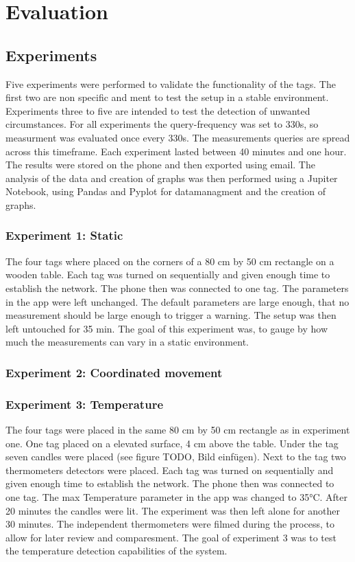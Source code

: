 \chapter{Evaluation}
\label{chap:evaluation}



\section{Experiments}
\label{s:Experiments}
Five experiments were performed to validate the functionality of the tags.
The first two are non specific and ment to test the setup in a stable environment.
Experiments three to five are intended to test the detection of unwanted circumstances.
For all experiments the query-frequency was set to 330s, so measurment was evaluated once every 330s.
The measurements queries are spread across this timeframe.
Each experiment lasted between 40 minutes and one hour.
The results were stored on the phone and then exported using email.
The analysis of the data and creation of graphs was then performed using a Jupiter Notebook, using Pandas and Pyplot for datamanagment and the creation of graphs.


\subsection{Experiment 1: Static}
\label{ss:exp_1}
The four tags where placed on the corners of a 80 cm by 50 cm rectangle on a wooden table.
Each tag was turned on sequentially and given enough time to establish the network.
The phone then was connected to one tag.
The parameters in the app were left unchanged.
The default parameters are large enough, that no measurement should be large enough to trigger a warning.
The setup was then left untouched for 35 min.
The goal of this experiment was, to gauge by how much the measurements can vary in a static environment.
 

\subsection{Experiment 2: Coordinated movement}
\label{ss:exp_2}

\subsection{Experiment 3: Temperature}
\label{ss:exp_3}
The four tags were placed in the same 80 cm by 50 cm rectangle as in experiment one.
One tag placed on a elevated surface, 4 cm above the table.
Under the tag seven candles were placed (see figure TODO, Bild einfügen).
Next to the tag two thermometers detectors were placed.
Each tag was turned on sequentially and given enough time to establish the network.
The phone then was connected to one tag.
The max Temperature parameter in the app was changed to 35°C.
After 20 minutes the candles were lit.
The experiment was then left alone for another 30 minutes.
The independent thermometers were filmed during the process, to allow for later review and comparesment.
The goal of experiment 3 was to test the temperature detection capabilities of the system.


